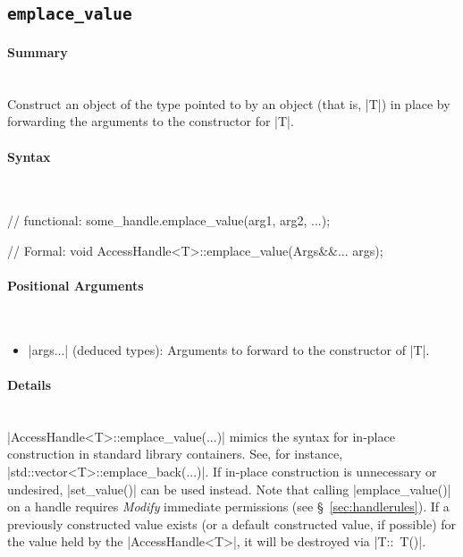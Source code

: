 \subsection{\texttt{emplace\_value}}
\label{ssec:api_fe_emplace_value}

\paragraph{Summary}\mbox{}\\ 
Construct an object of the type pointed to by an \ahandleT object
(that is, |T|) in place by forwarding the arguments to the constructor
for |T|.

\paragraph{Syntax}\mbox{}\\ 
\begin{CppCode}
// functional:
some_handle.emplace_value(arg1, arg2, ...);

// Formal:
void AccessHandle<T>::emplace_value(Args&&... args);
\end{CppCode}

\paragraph{Positional Arguments}\mbox{}\\ 
\begin{itemize}
  \item |args...| (deduced types):  Arguments to forward to the
  constructor of |T|.
\end{itemize}

\paragraph{Details}\mbox{}\\ 

|AccessHandle<T>::emplace_value(...)| mimics the syntax for in-place
construction in standard library containers.  See, for instance,
|std::vector<T>::emplace_back(...)|.  If in-place construction is
unnecessary or undesired, |set_value()| can be used instead.  
Note that calling |emplace_value()| on a handle requires {\it Modify} immediate
permissions (see \S~\ref{sec:handlerules}).  If a previously constructed value
exists (or a default constructed value, if possible) for the value held by the
|AccessHandle<T>|, it will be destroyed via |T::~T()|.


